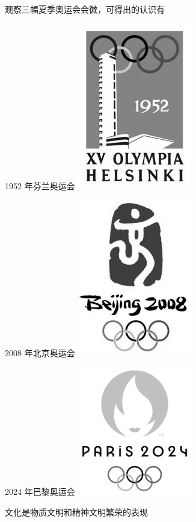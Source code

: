 \documentclass{exam-zh}
\begin{document}
\begin{question}
  观察三幅夏季奥运会会徽，可得出的认识有

  \begin{multifigures}
    \item[1952 年芬兰奥运会] \includegraphics[width=5cm]{helsinki.png}
    \item[2008 年北京奥运会] \includegraphics[width=5cm]{beijing.png}
    \item[2024 年巴黎奥运会] \includegraphics[width=5cm]{paris.png}
  \end{multifigures}

   文化是物质文明和精神文明繁荣的表现


\end{question}
\end{document}
